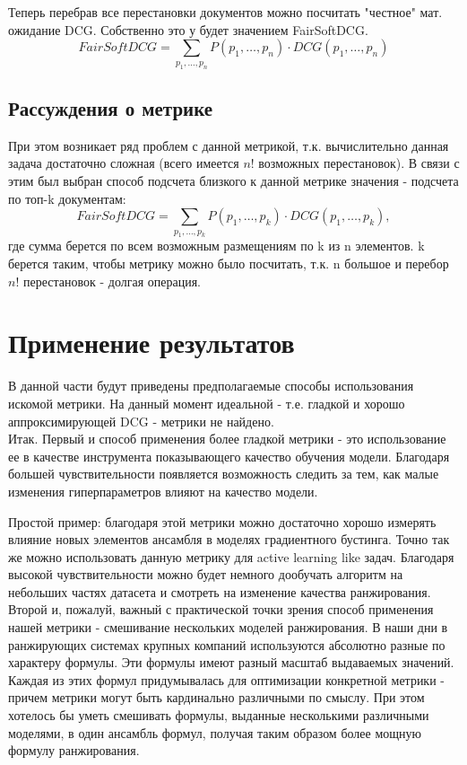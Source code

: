 \documentclass[14pt,a4paper]{amsart}
\theoremstyle{definition}
\theoremstyle{definition}
\newcommand{\Sum}{\sum\limits}
\begin{document}
Теперь перебрав все перестановки документов можно посчитать "честное" мат. ожидание DCG. Собственно это у будет значением FairSoftDCG.
$$FairSoftDCG = \Sum_{p_1,\dots,p_n} P(p_1,\dots,p_n) \cdot DCG(p_1,\dots,p_n)$$

\subsection{Рассуждения о метрике}

При этом возникает ряд проблем с данной метрикой, т.к. вычислительно данная задача достаточно сложная (всего имеется $n!$ возможных перестановок). В связи с этим был выбран способ подсчета близкого к данной метрике значения - подсчета по топ-k документам:
$$FairSoftDCG = \Sum_{p_1,\dots,p_k} P(p_1,\dots,p_k) \cdot DCG(p_1,\dots,p_k),$$ где сумма берется по всем возможным размещениям по k из n элементов. k берется таким, чтобы метрику можно было посчитать, т.к. n большое и перебор $n!$ перестановок - долгая операция.



\newpage
\section{Применение результатов}

В данной части будут приведены предполагаемые способы использования искомой метрики. На данный момент идеальной - т.е. гладкой и хорошо аппроксимирующей DCG - метрики не найдено. \\

Итак. Первый и способ применения более гладкой метрики - это использование ее в качестве инструмента показывающего качество обучения модели. Благодаря большей чувствительности появляется возможность следить за тем, как малые изменения гиперпараметров влияют на качество модели.

Простой пример: благодаря этой метрики можно достаточно хорошо измерять влияние новых элементов ансамбля в моделях градиентного бустинга. Точно так же можно использовать данную метрику для active learning like задач. Благодаря высокой чувствительности можно будет немного дообучать алгоритм на небольших частях датасета и смотреть на изменение качества ранжирования. \\

Второй и, пожалуй, важный с практической точки зрения способ применения нашей метрики - смешивание нескольких моделей ранжирования. В наши дни в ранжирующих системах крупных компаний используются абсолютно разные по характеру формулы. Эти формулы имеют разный масштаб выдаваемых значений. Каждая из этих формул придумывалась для оптимизации конкретной метрики - причем метрики могут быть кардинально различными по смыслу. При этом хотелось бы уметь смешивать формулы, выданные несколькими различными моделями, в один ансамбль формул, получая таким образом более мощную формулу ранжирования.
\end{document}
